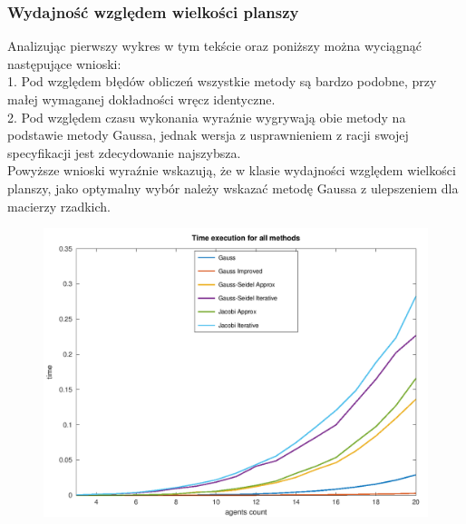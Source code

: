 \documentclass[10pt]{article}
\begin{document}
\subsubsection{Wydajność względem wielkości planszy}
Analizując pierwszy wykres w tym tekście oraz poniższy można wyciągnąć następujące wnioski:\\
1. Pod względem błędów obliczeń wszystkie metody są bardzo podobne, przy małej wymaganej dokładności wręcz identyczne.\\
2. Pod względem czasu wykonania wyraźnie wygrywają obie metody na podstawie metody Gaussa, jednak wersja z usprawnieniem z racji swojej specyfikacji jest zdecydowanie najszybsza.
\\
Powyższe wnioski wyraźnie wskazują, że w klasie wydajności względem wielkości planszy, jako optymalny wybór należy wskazać metodę Gaussa z ulepszeniem dla macierzy rzadkich.
\begin{figure}[h]
\centering
\includegraphics[scale=0.75]{plots/02_time_execution_all_methods.png}
\end{figure}
\newpage
\end{document}
